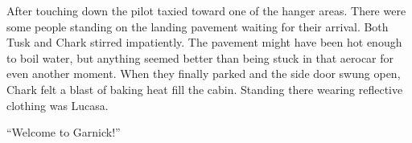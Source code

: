 After touching down the pilot taxied toward one of the hanger areas. There were some people
standing on the landing pavement waiting for their arrival. Both Tusk and Chark stirred
impatiently. The pavement might have been hot enough to boil water, but anything seemed better
than being stuck in that aerocar for even another moment. When they finally parked and the side
door swung open, Chark felt a blast of baking heat fill the cabin. Standing there wearing
reflective clothing was Lucasa.

``Welcome to Garnick!''

